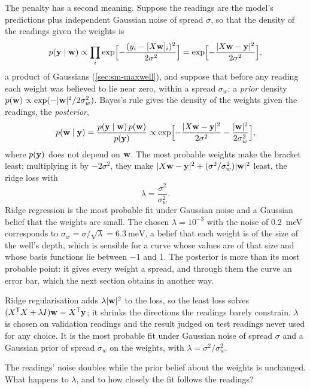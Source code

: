 The penalty has a second meaning. Suppose the readings are the model's
predictions plus independent Gaussian noise of spread $\sigma$, so that
the density of the readings given the weights is
\begin{equation*}
   p(\bm{\mathrm{y}}\mid\bm{\mathrm{w}}) \propto \prod_i\exp\Bigl[-\frac{(y_i -
   [X\bm{\mathrm{w}}]_i)^2}{2\sigma^2}\Bigr]
   = \exp\Bigl[-\frac{\lvert X\bm{\mathrm{w}} - \bm{\mathrm{y}}\rvert^2}{2\sigma^2}\Bigr] ,
\end{equation*}
a product of Gaussians (\cref{sec:sm-maxwell}), and suppose that before
any reading each weight was believed to lie near zero, within a spread
$\sigma_w$: a \emph{prior} density $p(\bm{\mathrm{w}}) \propto
\exp(-\lvert\bm{\mathrm{w}}\rvert^2/2\sigma_w^2)$. Bayes's rule gives the density
of the weights given the readings, the \emph{posterior},
\begin{equation*}
   p(\bm{\mathrm{w}}\mid\bm{\mathrm{y}}) = \frac{p(\bm{\mathrm{y}}\mid\bm{\mathrm{w}})\,p(\bm{\mathrm{w}})}{p(\bm{\mathrm{y}})}
   \propto \exp\Bigl[-\frac{\lvert X\bm{\mathrm{w}} - \bm{\mathrm{y}}\rvert^2}{2\sigma^2}
   - \frac{\lvert\bm{\mathrm{w}}\rvert^2}{2\sigma_w^2}\Bigr] ,
\end{equation*}
where $p(\bm{\mathrm{y}})$ does not depend on $\bm{\mathrm{w}}$. The most probable weights
make the bracket least; multiplying it by $-2\sigma^2$, they make
$\lvert X\bm{\mathrm{w}} - \bm{\mathrm{y}}\rvert^2 + (\sigma^2/\sigma_w^2)\lvert
\bm{\mathrm{w}}\rvert^2$ least, the ridge loss with
\begin{equation*}
   \lambda = \frac{\sigma^2}{\sigma_w^2} .
\end{equation*}
Ridge regression is the most probable fit under Gaussian noise and a
Gaussian belief that the weights are small. The chosen $\lambda = 10^{-3}$
with the noise of \SI{0.2}{\milli\electronvolt} corresponds to $\sigma_w
= \sigma/\sqrt\lambda = \SI{6.3}{\milli\electronvolt}$, a belief that
each weight is of the size of the well's depth, which is sensible for a
curve whose values are of that size and whose basis functions lie
between $-1$ and 1. The posterior is more than its most probable point:
it gives every weight a spread, and through them the curve an error bar,
which the next section obtains in another way.

\begin{keyidea}
Ridge regularisation adds $\lambda\lvert\bm{\mathrm{w}}\rvert^2$ to the loss, so
the least loss solves $(X^{\mathsf T}X + \lambda I)\bm{\mathrm{w}} = X^{\mathsf
T}\bm{\mathrm{y}}$; it shrinks the directions the readings barely constrain.
$\lambda$ is chosen on validation readings and the result judged on test
readings never used for any choice. It is the most probable fit under
Gaussian noise of spread $\sigma$ and a Gaussian prior of spread
$\sigma_w$ on the weights, with $\lambda = \sigma^2/\sigma_w^2$.
\end{keyidea}


\begin{selfcheck}
The readings' noise doubles while the prior belief about the weights is
unchanged. What happens to $\lambda$, and to how closely the fit follows
the readings?
\end{selfcheck}

